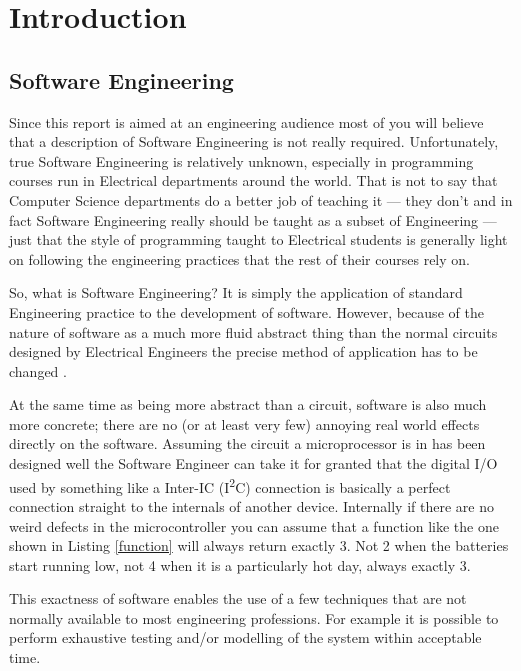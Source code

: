 \section{Introduction}

  \subsection{Software Engineering}

    Since this report is aimed at an engineering audience most of you will
    believe that a description of Software Engineering is not really required.
    Unfortunately, true Software Engineering is relatively unknown, especially in
    programming courses run in Electrical departments around the world.  That is
    not to say that Computer Science departments do a better job of teaching it
    --- they don't \cite{Shepard:2001:MTT:376134.376180} and in fact Software
    Engineering really should be taught as a subset of Engineering
    \cite{Parnas_1999} --- just that the style of programming taught to
    Electrical students is generally light on following the engineering
    practices that the rest of their courses rely on.

    So, what is Software Engineering?  It is simply the application of standard
    Engineering practice to the development of software.  However, because of the
    nature of software as a much more fluid abstract thing than the normal
    circuits designed by Electrical Engineers the precise method of application
    has to be changed \cite{vanVliet:2000:SEP:352372}.

    At the same time as being more abstract than a circuit, software is also
    much more concrete; there are no (or at least very few) annoying real world
    effects directly on the software.  Assuming the circuit a microprocessor is
    in has been designed well the Software Engineer can take it for granted that
    the digital I/O used by something like a Inter-IC (I\textsuperscript{2}C)
    connection is basically a perfect connection straight to the internals of
    another device.  Internally if there are no weird defects in the
    microcontroller you can assume that a function like the one shown in Listing
    \ref{function} will always return exactly 3.  Not 2 when the batteries start
    running low, not 4 when it is a particularly hot day, always exactly 3.

    This exactness of software enables the use of a few techniques that are not
    normally available to most engineering professions.  For example it is
    possible to perform exhaustive testing and/or modelling of the system within
    acceptable time.


